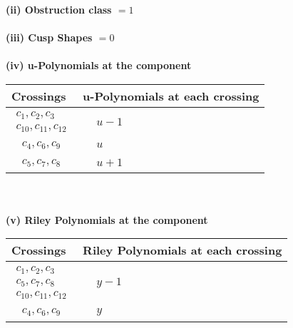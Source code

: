 \documentclass[1p]{elsarticle_modified}
\theoremstyle{definition}
\begin{document}
\flushleft \textbf{(ii) Obstruction class $= 1$}\\~\\
\flushleft \textbf{(iii) Cusp Shapes $= 0$}\\~\\
\newpage\renewcommand{\arraystretch}{1}
\flushleft \textbf{(iv) u-Polynomials at the component}\newline \\
\begin{tabular}{m{50pt}|m{274pt}}
Crossings & \hspace{64pt}u-Polynomials at each crossing \\
\hline $$\begin{aligned}c_{1},c_{2},c_{3}\\c_{10},c_{11},c_{12}\end{aligned}$$&$\begin{aligned}
&u-1
\end{aligned}$\\
\hline $$\begin{aligned}c_{4},c_{6},c_{9}\end{aligned}$$&$\begin{aligned}
&u
\end{aligned}$\\
\hline $$\begin{aligned}c_{5},c_{7},c_{8}\end{aligned}$$&$\begin{aligned}
&u+1
\end{aligned}$\\
\hline
\end{tabular}\\~\\
\newpage\renewcommand{\arraystretch}{1}
\flushleft \textbf{(v) Riley Polynomials at the component}\newline \\
\begin{tabular}{m{50pt}|m{274pt}}
Crossings & \hspace{64pt}Riley Polynomials at each crossing \\
\hline $$\begin{aligned}c_{1},c_{2},c_{3}\\c_{5},c_{7},c_{8}\\c_{10},c_{11},c_{12}\end{aligned}$$&$\begin{aligned}
&y-1
\end{aligned}$\\
\hline $$\begin{aligned}c_{4},c_{6},c_{9}\end{aligned}$$&$\begin{aligned}
&y
\end{aligned}$\\
\hline
\end{tabular}\\~\\
\end{document}
